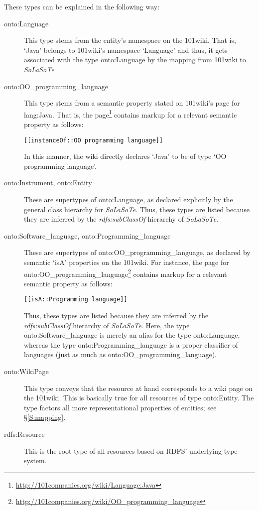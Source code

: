 \documentclass{article}
\newcommand{\uri}[1]{\textsf{#1}}
\newcommand{\ooo}[1]{\textsf{101#1}}%
\newcommand{\solasote}{{\itshape\textsf{SoLaSoTe}}}
\begin{document}
\noindent
These types can be explained in the following way:
%
\begin{description}
%
\item[\uri{onto:Language}] This type stems from the entity's namespace
  on the \ooo{wiki}. That is, `Java' belongs to \ooo{wiki}'s namespace
  `Language' and thus, it gets associated with the type \uri{onto:Language}
  by the mapping from \ooo{wiki} to \solasote
%
\item[\uri{onto:OO\_programming\_language}] This type stems from a
  semantic property stated on \ooo{wiki}'s page for \uri{lang:Java}. That
  is, the
  page\footnote{\url{http://101companies.org/wiki/Language:Java}}
  contains markup for a relevant semantic property as follows:
\begin{center}
\begin{BVerbatim}
[[instanceOf::OO programming language]]
\end{BVerbatim}
\end{center}
\noindent
In this manner, the wiki directly declares `Java' to be of type `OO
programming language'.
%
\item[\uri{onto:Instrument}, \uri{onto:Entity}] These are supertypes
  of \uri{onto:Language}, as declared explicitly by the general class
  hierarchy for \solasote. Thus, these types are listed because they
  are inferred by the \emph{rdfs:subClassOf} hierarchy of \solasote.
%
\item[\uri{onto:Software\_language}, \uri{onto:Programming\_language}]
  These are supertypes of \uri{onto:OO\_programming\_language}, as
  declared by semantic `isA' properties on the \ooo{wiki}. For
  instance, the
  page for \uri{onto:OO\_programming\_language}\footnote{\url{http://101companies.org/wiki/OO_programming_language}}
  contains markup for a relevant semantic property as follows:
\begin{center}
\begin{BVerbatim}
[[isA::Programming language]]
\end{BVerbatim}
\end{center}
\noindent
Thus, these types are listed because they are inferred by the
\emph{rdfs:subClassOf} hierarchy of \solasote. Here, the type
\uri{onto:Software\_language} is merely an alias for the type
\uri{onto:Language}, whereas the type \uri{onto:Programming\_language}
is a proper classifier of languages (just as much as
\uri{onto:OO\_programming\_language}).
%
\item[\uri{onto:WikiPage}] This type conveys that the resource at hand
  corresponds to a wiki page on the \ooo{wiki}. This is basically
  true for all resources of type \uri{onto:Entity}. The type factors
  all more representational properties of entities; see
  \S\ref{S:mapping}.
%
\item[\uri{rdfs:Resource}] This is the root type of all resources
  based on RDFS' underlying type system.
\end{description}
\end{document}
